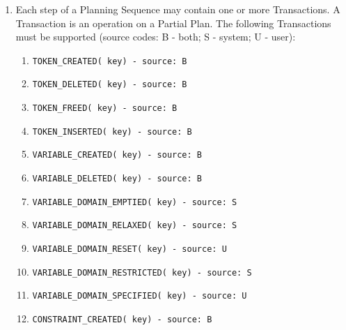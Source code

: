 \documentclass[twoside, 11pt]{article}
\begin{document}
\begin{enumerate}
\item Each step of a Planning Sequence may contain one or more Transactions. A Transaction is an operation on a Partial Plan. The following Transactions  must be supported (source codes: B - both; S - system; U - user):
\begin{enumerate}
\item \begin{verbatim}TOKEN_CREATED( key) - source: B\end{verbatim}
\item \begin{verbatim}TOKEN_DELETED( key) - source: B\end{verbatim}
\item \begin{verbatim}TOKEN_FREED( key) - source: B\end{verbatim}
\item \begin{verbatim}TOKEN_INSERTED( key) - source: B\end{verbatim}
\item \begin{verbatim}VARIABLE_CREATED( key) - source: B\end{verbatim}
\item \begin{verbatim}VARIABLE_DELETED( key) - source: B\end{verbatim}
\item \begin{verbatim}VARIABLE_DOMAIN_EMPTIED( key) - source: S\end{verbatim}
\item \begin{verbatim}VARIABLE_DOMAIN_RELAXED( key) - source: S\end{verbatim}
\item \begin{verbatim}VARIABLE_DOMAIN_RESET( key) - source: U\end{verbatim}
\item \begin{verbatim}VARIABLE_DOMAIN_RESTRICTED( key) - source: S\end{verbatim}
\item \begin{verbatim}VARIABLE_DOMAIN_SPECIFIED( key) - source: U\end{verbatim}
\item \begin{verbatim}CONSTRAINT_CREATED( key) - source: B\end{verbatim}

\end{enumerate}
\end{enumerate}
\end{document}
